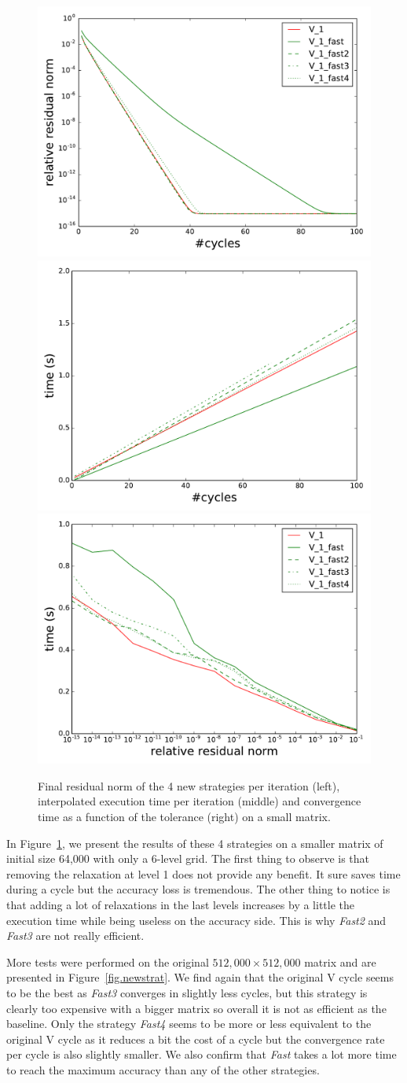   \begin{figure}
  \includegraphics[width=0.33\linewidth]{figs/convergence_fast_small_norm.pdf}
  \includegraphics[width=0.33\linewidth]{figs/convergence_fast_small_time.pdf}
   \includegraphics[width=0.33\linewidth]{figs/time_convergence_fast_small.pdf}
  \caption{Final residual norm of the 4 new strategies per iteration (left), interpolated execution time per iteration (middle) and convergence time as a function of the tolerance (right) on a small matrix.}
   \label{fig.newstrat_small}
  \end{figure}

  In Figure~\ref{fig.newstrat_small}, we present the results of these 4 strategies on a smaller matrix of initial size 64,000 with only a 6-level grid.
  The first thing to observe is that removing the relaxation at level 1 does not provide any benefit. It sure saves time during a cycle but the accuracy loss is tremendous.
  The other thing to notice is that adding a lot of relaxations in the last levels increases by a little the execution time while being useless on the accuracy side. This is why \emph{Fast2} and  \emph{Fast3} are not really efficient.

  More tests were performed on the original $512,000\times 512,000$ matrix and are presented in Figure~\ref{fig.newstrat}. We find again that the original V cycle seems to be the best as \emph{Fast3} converges in slightly less cycles, but this strategy is clearly too expensive with a bigger matrix so overall it is not as efficient as the baseline. Only the strategy \emph{Fast4} seems to be more or less equivalent to the original V cycle as it reduces a bit the cost of a cycle but the convergence rate per cycle is also slightly smaller. We also confirm that \emph{Fast} takes a lot more time to reach the maximum accuracy than any of the other strategies.

